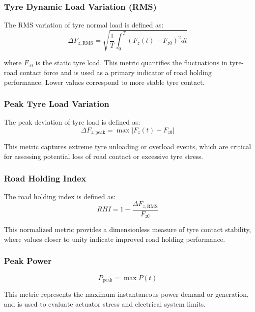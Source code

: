 \subsubsection{Tyre Dynamic Load Variation (RMS)}

The RMS variation of tyre normal load is defined as:
\begin{equation}
\Delta F_{z,\mathrm{RMS}} = \sqrt{\frac{1}{T} \int_0^T \left(F_z(t) - F_{z0}\right)^2 dt}
\end{equation}

where $F_{z0}$ is the static tyre load. This metric quantifies the fluctuations in tyre-road contact force and is used as a primary indicator of road holding performance. Lower values correspond to more stable tyre contact.

\subsubsection{Peak Tyre Load Variation}

The peak deviation of tyre load is defined as:
\begin{equation}
\Delta F_{z,\mathrm{peak}} = \max \left|F_z(t) - F_{z0}\right|
\end{equation}

This metric captures extreme tyre unloading or overload events, which are critical for assessing potential loss of road contact or excessive tyre stress.

\subsubsection{Road Holding Index}

The road holding index is defined as:
\begin{equation}
RHI = 1 - \frac{\Delta F_{z,\mathrm{RMS}}}{F_{z0}}
\end{equation}

This normalized metric provides a dimensionless measure of tyre contact stability, where values closer to unity indicate improved road holding performance.

\subsubsection{Peak Power}

\begin{equation}
P_{\mathrm{peak}} = \max P(t)
\end{equation}

This metric represents the maximum instantaneous power demand or generation, and is used to evaluate actuator stress and electrical system limits.

